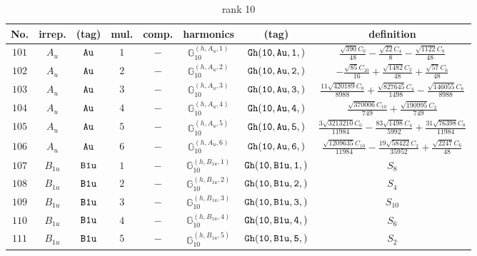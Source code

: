 \documentclass[fleqn,8pt]{jsarticle}
\begin{document}
\begin{table}[ht!]
\begin{center}
\caption{rank 10}
\renewcommand{\arraystretch}{1.3}
\begin{tabular}{cccccccc} \hline \hline
No. & irrep. & (tag) & mul. & comp. & harmonics & (tag) & definition \\ \hline
$ 101 $ & $ A_{u} $ & $ {\tt Au} $ & $ 1 $ & $ - $ & $ \mathbb{G}_{10}^{(h,A_{u},1)} $ & $ {\tt Gh(10,Au,1,)} $ & $ \frac{\sqrt{390} C_{0}}{48} - \frac{\sqrt{22} C_{4}}{8} - \frac{\sqrt{1122} C_{8}}{48} $ \\
$ 102 $ & $ A_{u} $ & $ {\tt Au} $ & $ 2 $ & $ - $ & $ \mathbb{G}_{10}^{(h,A_{u},2)} $ & $ {\tt Gh(10,Au,2,)} $ & $ - \frac{\sqrt{85} C_{10}}{16} + \frac{\sqrt{1482} C_{2}}{48} + \frac{\sqrt{57} C_{6}}{48} $ \\
$ 103 $ & $ A_{u} $ & $ {\tt Au} $ & $ 3 $ & $ - $ & $ \mathbb{G}_{10}^{(h,A_{u},3)} $ & $ {\tt Gh(10,Au,3,)} $ & $ \frac{11 \sqrt{420189} C_{0}}{8988} + \frac{\sqrt{827645} C_{4}}{1498} - \frac{\sqrt{146055} C_{8}}{8988} $ \\
$ 104 $ & $ A_{u} $ & $ {\tt Au} $ & $ 4 $ & $ - $ & $ \mathbb{G}_{10}^{(h,A_{u},4)} $ & $ {\tt Gh(10,Au,4,)} $ & $ \frac{\sqrt{370006} C_{10}}{749} + \frac{\sqrt{190995} C_{2}}{749} $ \\
$ 105 $ & $ A_{u} $ & $ {\tt Au} $ & $ 5 $ & $ - $ & $ \mathbb{G}_{10}^{(h,A_{u},5)} $ & $ {\tt Gh(10,Au,5,)} $ & $ \frac{3 \sqrt{3213210} C_{0}}{11984} - \frac{83 \sqrt{1498} C_{4}}{5992} + \frac{31 \sqrt{76398} C_{8}}{11984} $ \\
$ 106 $ & $ A_{u} $ & $ {\tt Au} $ & $ 6 $ & $ - $ & $ \mathbb{G}_{10}^{(h,A_{u},6)} $ & $ {\tt Gh(10,Au,6,)} $ & $ \frac{\sqrt{1209635} C_{10}}{11984} - \frac{19 \sqrt{58422} C_{2}}{35952} + \frac{\sqrt{2247} C_{6}}{48} $ \\
$ 107 $ & $ B_{1u} $ & $ {\tt B1u} $ & $ 1 $ & $ - $ & $ \mathbb{G}_{10}^{(h,B_{1u},1)} $ & $ {\tt Gh(10,B1u,1,)} $ & $ S_{8} $ \\
$ 108 $ & $ B_{1u} $ & $ {\tt B1u} $ & $ 2 $ & $ - $ & $ \mathbb{G}_{10}^{(h,B_{1u},2)} $ & $ {\tt Gh(10,B1u,2,)} $ & $ S_{4} $ \\
$ 109 $ & $ B_{1u} $ & $ {\tt B1u} $ & $ 3 $ & $ - $ & $ \mathbb{G}_{10}^{(h,B_{1u},3)} $ & $ {\tt Gh(10,B1u,3,)} $ & $ S_{10} $ \\
$ 110 $ & $ B_{1u} $ & $ {\tt B1u} $ & $ 4 $ & $ - $ & $ \mathbb{G}_{10}^{(h,B_{1u},4)} $ & $ {\tt Gh(10,B1u,4,)} $ & $ S_{6} $ \\
$ 111 $ & $ B_{1u} $ & $ {\tt B1u} $ & $ 5 $ & $ - $ & $ \mathbb{G}_{10}^{(h,B_{1u},5)} $ & $ {\tt Gh(10,B1u,5,)} $ & $ S_{2} $ \\

\end{tabular}
\end{center}
\end{table}
\end{document}
